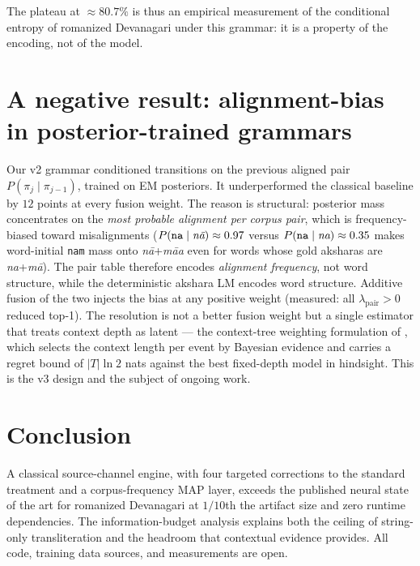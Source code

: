 \documentclass[11pt,a4paper]{article}
\newcommand{\na}{\emph{na}}
\newcommand{\naa}{\emph{n\=a}}
\newcommand{\mma}{\emph{m\=a}}
\newcommand{\mmaa}{\emph{m\=aa}}
\begin{document}
The plateau at $\approx 80.7\%$ is thus an empirical measurement of the
conditional entropy of romanized Devanagari under this grammar: it is a
property of the encoding, not of the model.

\section{A negative result: alignment-bias in posterior-trained grammars}

Our v2 grammar conditioned transitions on the previous aligned pair
$P(\pi_j \mid \pi_{j-1})$, trained on EM posteriors. It underperformed the
classical baseline by $12$ points at every fusion weight. The reason is
structural: posterior mass concentrates on the \emph{most probable
alignment per corpus pair}, which is frequency-biased toward misalignments
($P(\text{\texttt{na}} \mid \naa) \approx 0.97$ versus
$P(\text{\texttt{na}} \mid \na) \approx 0.35$ makes word-initial
\texttt{nam} mass onto \naa{}+\mmaa{} even for words whose gold aksharas
are \na{}+\mma). The pair table therefore encodes \emph{alignment
frequency}, not word structure, while the deterministic akshara LM encodes
word structure. Additive fusion of the two injects the bias at any positive
weight (measured: all $\lambda_{\mathrm{pair}} > 0$ reduced top-1). The
resolution is not a better fusion weight but a single estimator that treats
context depth as latent --- the context-tree weighting formulation of
\citet{ctw1995}, which selects the context length per event by Bayesian
evidence and carries a regret bound of $|T|\ln 2$ nats against the best
fixed-depth model in hindsight. This is the v3 design and the subject of
ongoing work.

\section{Conclusion}

A classical source-channel engine, with four targeted corrections to the
standard treatment and a corpus-frequency MAP layer, exceeds the published
neural state of the art for romanized Devanagari at $1/10$th the artifact
size and zero runtime dependencies. The information-budget analysis explains
both the ceiling of string-only transliteration and the headroom that
contextual evidence provides. All code, training data sources, and
measurements are open.
\end{document}
